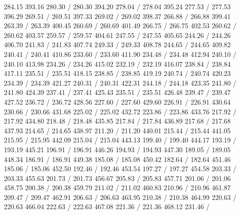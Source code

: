 { 284.15 393.16 280.30 /
 280.30 394.20 278.04 /
 278.04 395.24 277.53 /
 277.53 396.29 269.51 /
 269.51 397.33 269.02 /
 269.02 398.37 266.88 /
 266.88 399.41 263.39 /
 263.39 400.45 260.69 /
 260.69 401.49 266.75 /
 266.75 402.53 260.62 /
 260.62 403.57 259.57 /
 259.57 404.61 247.55 /
 247.55 405.65 244.26 /
 244.26 406.70 241.83 /
 241.83 407.74 249.33 /
 249.33 408.78 244.65 /
 244.65 409.82 240.41 /
 240.41 410.86 233.60 /
 233.60 411.90 234.48 /
 234.48 412.94 240.10 /
 240.10 413.98 234.26 /
 234.26 415.02 232.19 /
 232.19 416.07 238.84 /
 238.84 417.11 235.51 /
 235.51 418.15 238.85 /
 238.85 419.19 240.74 /
 240.74 420.23 234.39 /
 234.39 421.27 240.31 /
 240.31 422.31 244.18 /
 244.18 423.35 241.80 /
 241.80 424.39 237.41 /
 237.41 425.43 235.51 /
 235.51 426.48 239.47 /
 239.47 427.52 236.72 /
 236.72 428.56 227.60 /
 227.60 429.60 226.91 /
 226.91 430.64 230.66 /
 230.66 431.68 225.02 /
 225.02 432.72 223.86 /
 223.86 433.76 217.92 /
 217.92 434.80 218.48 /
 218.48 435.85 217.84 /
 217.84 436.89 217.68 /
 217.68 437.93 214.65 /
 214.65 438.97 211.20 /
 211.20 440.01 215.44 /
 215.44 441.05 215.95 /
 215.95 442.09 215.04 /
 215.04 443.13 199.40 /
 199.40 444.17 193.19 /
 193.19 445.21 196.91 /
 196.91 446.26 194.93 /
 194.93 447.30 189.05 /
 189.05 448.34 186.91 /
 186.91 449.38 185.08 /
 185.08 450.42 182.64 /
 182.64 451.46 185.06 /
 185.06 452.50 192.46 /
 192.46 453.54 197.27 /
 197.27 454.58 203.33 /
 203.33 455.63 201.73 /
 201.73 456.67 205.83 /
 205.83 457.71 201.06 /
 201.06 458.75 200.38 /
 200.38 459.79 211.02 /
 211.02 460.83 210.96 /
 210.96 461.87 209.47 /
 209.47 462.91 206.63 /
 206.63 463.95 210.38 /
 210.38 464.99 220.63 /
 220.63 466.04 222.63 /
 222.63 467.08 221.36 /
 221.36 468.12 231.46 /
}
